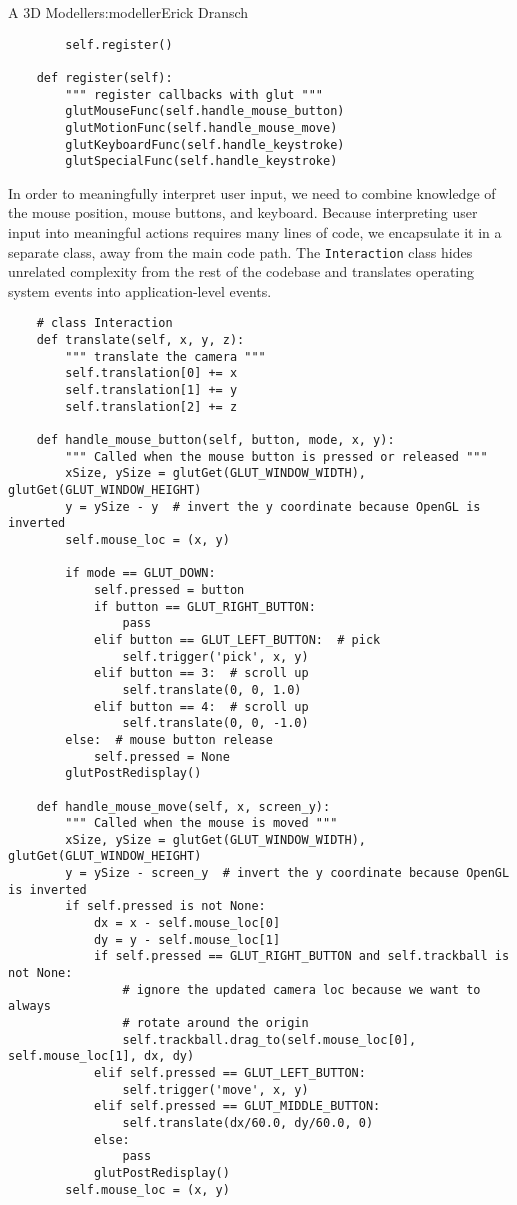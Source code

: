 \begin{aosachapter}{A 3D Modeller}{s:modeller}{Erick Dransch}
\begin{verbatim}
        self.register()

    def register(self):
        """ register callbacks with glut """
        glutMouseFunc(self.handle_mouse_button)
        glutMotionFunc(self.handle_mouse_move)
        glutKeyboardFunc(self.handle_keystroke)
        glutSpecialFunc(self.handle_keystroke)
\end{verbatim}

\label{operating-system-callbacks}

In order to meaningfully interpret user input, we need to combine
knowledge of the mouse position, mouse buttons, and keyboard. Because
interpreting user input into meaningful actions requires many lines of
code, we encapsulate it in a separate class, away from the main code
path. The \texttt{Interaction} class hides unrelated complexity from the
rest of the codebase and translates operating system events into
application-level events.

\begin{verbatim}
    # class Interaction 
    def translate(self, x, y, z):
        """ translate the camera """
        self.translation[0] += x
        self.translation[1] += y
        self.translation[2] += z

    def handle_mouse_button(self, button, mode, x, y):
        """ Called when the mouse button is pressed or released """
        xSize, ySize = glutGet(GLUT_WINDOW_WIDTH), glutGet(GLUT_WINDOW_HEIGHT)
        y = ySize - y  # invert the y coordinate because OpenGL is inverted
        self.mouse_loc = (x, y)

        if mode == GLUT_DOWN:
            self.pressed = button
            if button == GLUT_RIGHT_BUTTON:
                pass
            elif button == GLUT_LEFT_BUTTON:  # pick
                self.trigger('pick', x, y)
            elif button == 3:  # scroll up
                self.translate(0, 0, 1.0)
            elif button == 4:  # scroll up
                self.translate(0, 0, -1.0)
        else:  # mouse button release
            self.pressed = None
        glutPostRedisplay()

    def handle_mouse_move(self, x, screen_y):
        """ Called when the mouse is moved """
        xSize, ySize = glutGet(GLUT_WINDOW_WIDTH), glutGet(GLUT_WINDOW_HEIGHT)
        y = ySize - screen_y  # invert the y coordinate because OpenGL is inverted
        if self.pressed is not None:
            dx = x - self.mouse_loc[0]
            dy = y - self.mouse_loc[1]
            if self.pressed == GLUT_RIGHT_BUTTON and self.trackball is not None:
                # ignore the updated camera loc because we want to always
                # rotate around the origin
                self.trackball.drag_to(self.mouse_loc[0], self.mouse_loc[1], dx, dy)
            elif self.pressed == GLUT_LEFT_BUTTON:
                self.trigger('move', x, y)
            elif self.pressed == GLUT_MIDDLE_BUTTON:
                self.translate(dx/60.0, dy/60.0, 0)
            else:
                pass
            glutPostRedisplay()
        self.mouse_loc = (x, y)


\end{verbatim}
\end{aosachapter}
